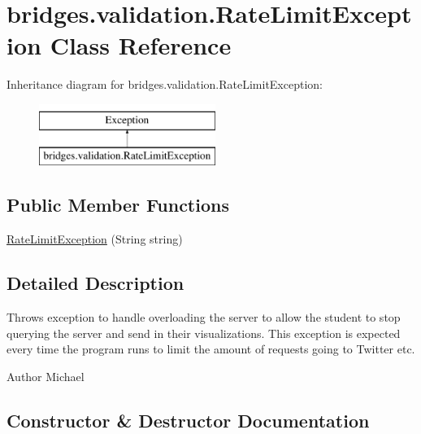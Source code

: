 \hypertarget{classbridges_1_1validation_1_1_rate_limit_exception}{}\section{bridges.\+validation.\+Rate\+Limit\+Exception Class Reference}
\label{classbridges_1_1validation_1_1_rate_limit_exception}
Inheritance diagram for bridges.\+validation.\+Rate\+Limit\+Exception\+:\begin{figure}[H]
\begin{center}
\leavevmode
\includegraphics[height=2.000000cm]{classbridges_1_1validation_1_1_rate_limit_exception}
\end{center}
\end{figure}
\subsection*{Public Member Functions}
\begin{DoxyCompactItemize}
\item 
\hyperlink{classbridges_1_1validation_1_1_rate_limit_exception_a8375495a80a80213fe9201921c43afbc}{Rate\+Limit\+Exception} (String string)
\end{DoxyCompactItemize}


\subsection{Detailed Description}
Throws exception to handle overloading the server to allow the student to stop querying the server and send in their visualizations. This exception is expected every time the program runs to limit the amount of requests going to Twitter etc.

\begin{DoxyAuthor}{Author}
Michael 
\end{DoxyAuthor}


\subsection{Constructor \& Destructor Documentation}
\hypertarget{classbridges_1_1validation_1_1_rate_limit_exception_a8375495a80a80213fe9201921c43afbc}{}\label{classbridges_1_1validation_1_1_rate_limit_exception_a8375495a80a80213fe9201921c43afbc} 

